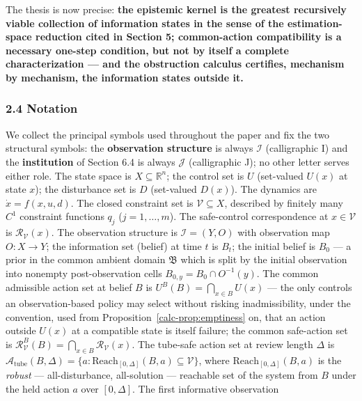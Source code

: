 \documentclass[10pt,twocolumn]{article}
\theoremstyle{definition}
\begin{document}
The thesis is now precise:
\textbf{the epistemic kernel is the greatest recursively viable collection of information states in the sense of the estimation-space reduction cited in Section 5; common-action compatibility is a necessary one-step condition, but not by itself a
complete characterization --- and the obstruction calculus certifies,
mechanism by mechanism, the information states outside it.}

\subsubsection{2.4 Notation}\label{calc-notation}

We collect the principal symbols used throughout the paper and fix the two structural symbols: the \textbf{observation structure} is always
\(\mathcal{I}\) (calligraphic I) and the \textbf{institution} of Section
6.4 is always \(\mathcal{J}\) (calligraphic J); no other letter serves either role. The state space is \(X \subseteq \mathbb{R}^n\); the
control set is \(U\) (set-valued \(U(x)\) at state \(x\)); the
disturbance set is \(D\) (set-valued \(D(x)\)). The dynamics are
\(\dot x = f(x,u,d)\). The closed constraint set is
\(\mathcal{V} \subseteq X\), described by finitely many \(C^1\)
constraint functions \(q_j\) (\(j = 1,\ldots,m\)). The safe-control
correspondence at \(x \in \mathcal{V}\) is
\(\mathcal{R}_{\mathcal{V}}(x)\). The observation structure is
\(\mathcal{I} = (Y, O)\) with observation map \(O : X \to Y\); the
information set (belief) at time \(t\) is \(B_t\); the initial belief is
\(B_0\) --- a prior in the common ambient domain
\(\mathfrak B\) which is split by the initial observation into
nonempty post-observation cells \(B_{0,y}=B_0\cap O^{-1}(y)\). The common
admissible action set at belief \(B\) is
\(U^B(B) = \bigcap_{x \in B} U(x)\) --- the only controls an
observation-based policy may select without risking inadmissibility,
under the convention, used from Proposition~\ref{calc-prop:emptiness} on, that an action outside
\(U(x)\) at a compatible state is itself failure; the common safe-action
set is
\(\mathcal{R}_{\mathcal{V}}^B(B) = \bigcap_{x \in B} \mathcal{R}_{\mathcal{V}}(x)\).
The tube-safe action set at review length \(\Delta\) is
\(\mathcal{A}_{\mathrm{tube}}(B, \Delta) = \{ a : \mathrm{Reach}_{[0,\Delta]}(B, a) \subseteq \mathcal{V} \}\),
where \(\mathrm{Reach}_{[0,\Delta]}(B, a)\) is the \emph{robust} ---
all-disturbance, all-solution --- reachable set of the system from \(B\) under the
held action \(a\) over \([0,\Delta]\). The first informative observation
\end{document}
